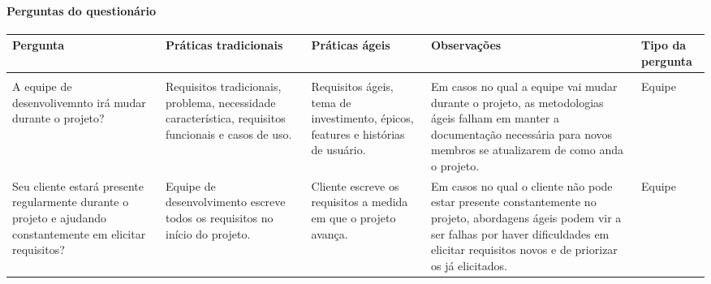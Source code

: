 \paragraph{Perguntas do questionário}
\label{sec:perguntas_do_questinario}
\clearpage


					\begin{longtable}{|p{3.5cm}|p{3.5cm}|p{3.5cm}|p{3.5cm}|p{2cm}|}
						\hline
						\textbf{Pergunta} &
						\textbf{Práticas tradicionais} &
						\textbf{Práticas ágeis} &
						\textbf{Observações} &
						\textbf{Tipo da pergunta}
						\\ \hline
						\endhead

						\hline \multicolumn{5}{|r|}{\longtableendfoot} \\ \hline
						\endfoot

						\endlastfoot

						A equipe de desenvolivemnto irá mudar durante o projeto? &
						Requisitos tradicionais, problema, necessidade característica, requisitos funcionais e casos de uso. &
						Requisitos ágeis, tema de investimento, épicos, features e histórias de usuário. &
						Em casos no qual a equipe vai mudar durante o projeto, as metodologias ágeis falham em manter a documentação necessária para novos membros se atualizarem de como anda o projeto. &
						Equipe
						\\ \hline

						Seu cliente estará presente regularmente durante o projeto e ajudando constantemente em elicitar requisitos? &
						Equipe de desenvolvimento escreve todos os requisitos no início do projeto. &
						Cliente escreve os requisitos a medida em que o projeto avança. &
						Em casos no qual o cliente não pode estar presente constantemente no projeto, abordagens ágeis podem vir a ser falhas por haver dificuldades em elicitar requisitos novos e de priorizar os já elicitados. &
						Equipe
						\\ \hline


\end{longtable}
